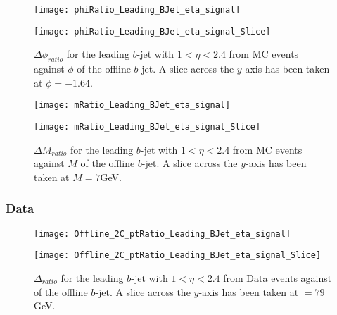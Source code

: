 	\begin{figure}[h]
		\centering

		\begin{minipage}[h]{0.33\linewidth}
			\texttt{[image: phiRatio\_Leading\_BJet\_eta\_signal]}
		\end{minipage}
		\quad
		\begin{minipage}[h]{0.33\linewidth}
			\texttt{[image: phiRatio\_Leading\_BJet\_eta\_signal\_Slice]}
		\end{minipage}
		\caption{$\Delta \phi_{ratio}$ for the leading \pt $b$-jet with $1 < \eta < 2.4$ from MC events against $\phi$ of the offline $b$-jet. A slice across the $y$-axis has been taken at $\phi=-1.64$. }
		\label{fig:MC:leadingbphicore}
	\end{figure}

	\begin{figure}[h]
		\centering

		\begin{minipage}[h]{0.33\linewidth}
			\texttt{[image: mRatio\_Leading\_BJet\_eta\_signal]}
		\end{minipage}
		\quad
		\begin{minipage}[h]{0.33\linewidth}
			\texttt{[image: mRatio\_Leading\_BJet\_eta\_signal\_Slice]}
		\end{minipage}
		\caption{$\Delta M_{ratio}$ for the leading \pt $b$-jet with $1 < \eta < 2.4$ from MC events against $M$ of the offline $b$-jet. A slice across the $y$-axis has been taken at $M=7$GeV. }
		\label{fig:MC:leadingbmcore}
	\end{figure}

\newpage
	\subsubsection{Data}
	
		\begin{figure}[h]
			\centering
			\begin{minipage}[h]{0.33\linewidth}
				\texttt{[image: Offline\_2C\_ptRatio\_Leading\_BJet\_eta\_signal]}
				
			\end{minipage}
			\quad
			\begin{minipage}[h]{0.33\linewidth}
				\texttt{[image: Offline\_2C\_ptRatio\_Leading\_BJet\_eta\_signal\_Slice]}
			\end{minipage}
			\caption{$\Delta $\pt$_{ratio}$ for the leading \pt $b$-jet with $1 < \eta < 2.4$ from Data events against \pt of the offline $b$-jet. A slice across the $y$-axis has been taken at \pt$=79$GeV. }
			\label{fig:D:leadingbptcore}
		\end{figure}
		
